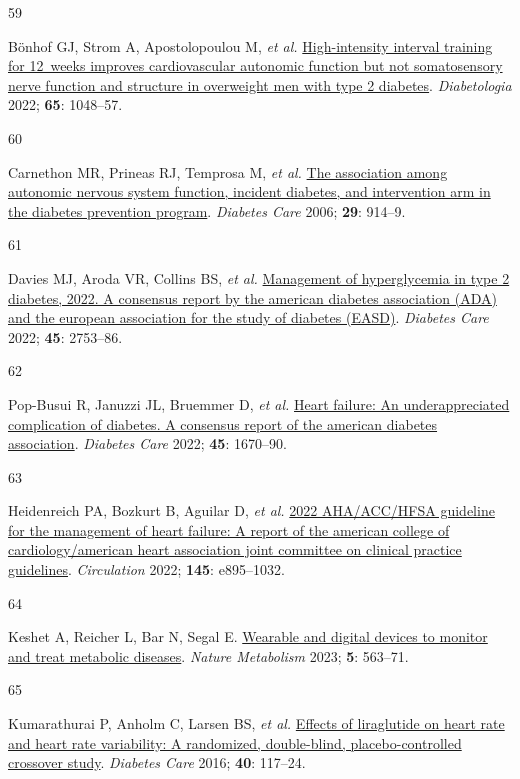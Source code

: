\documentclass[
  a4paper,
  headsepline=true,
  open=any]{scrbook}
\newlength{\cslhangindent}
\newlength{\csllabelwidth}
\newlength{\cslentryspacingunit} %
\newenvironment{CSLReferences}[2] %
 {%
  \setlength{\parindent}{0pt}
  \ifodd #1
  \let\oldpar\par
  \def\par{\hangindent=\cslhangindent\oldpar}
  \fi
  \setlength{\parskip}{#2\cslentryspacingunit}
 }%
 {}
\newcommand{\CSLLeftMargin}[1]{\parbox[t]{\csllabelwidth}{#1}}
\newcommand{\CSLRightInline}[1]{\parbox[t]{\linewidth - \csllabelwidth}{#1}\break}
\begin{document}
\begin{CSLReferences}{0}{0}
\leavevmode{}%
\CSLLeftMargin{59 }%
\CSLRightInline{Bönhof GJ, Strom A, Apostolopoulou M, \emph{et al.}
\href{https://doi.org/10.1007/s00125-022-05674-w}{High-intensity
interval training for 12~weeks improves cardiovascular autonomic
function but not somatosensory nerve function and structure in
overweight men with type 2 diabetes}. \emph{Diabetologia} 2022;
\textbf{65}: 1048--57.}

\leavevmode{}%
\CSLLeftMargin{60 }%
\CSLRightInline{Carnethon MR, Prineas RJ, Temprosa M, \emph{et al.}
\href{https://doi.org/10.2337/diacare.29.04.06.dc05-1729}{The
association among autonomic nervous system function, incident diabetes,
and intervention arm in the diabetes prevention program}. \emph{Diabetes
Care} 2006; \textbf{29}: 914--9.}

\leavevmode{}%
\CSLLeftMargin{61 }%
\CSLRightInline{Davies MJ, Aroda VR, Collins BS, \emph{et al.}
\href{https://doi.org/10.2337/dci22-0034}{Management of hyperglycemia in
type 2 diabetes, 2022. A consensus report by the american diabetes
association (ADA) and the european association for the study of diabetes
(EASD)}. \emph{Diabetes Care} 2022; \textbf{45}: 2753--86.}

\leavevmode{}%
\CSLLeftMargin{62 }%
\CSLRightInline{Pop-Busui R, Januzzi JL, Bruemmer D, \emph{et al.}
\href{https://doi.org/10.2337/dci22-0014}{Heart failure: An
underappreciated complication of diabetes. A consensus report of the
american diabetes association}. \emph{Diabetes Care} 2022; \textbf{45}:
1670--90.}

\leavevmode{}%
\CSLLeftMargin{63 }%
\CSLRightInline{Heidenreich PA, Bozkurt B, Aguilar D, \emph{et al.}
\href{https://doi.org/10.1161/CIR.0000000000001063}{2022 AHA/ACC/HFSA
guideline for the management of heart failure: A report of the american
college of cardiology/american heart association joint committee on
clinical practice guidelines}. \emph{Circulation} 2022; \textbf{145}:
e895--1032.}

\leavevmode{}%
\CSLLeftMargin{64 }%
\CSLRightInline{Keshet A, Reicher L, Bar N, Segal E.
\href{https://doi.org/10.1038/s42255-023-00778-y}{Wearable and digital
devices to monitor and treat metabolic diseases}. \emph{Nature
Metabolism} 2023; \textbf{5}: 563--71.}

\leavevmode{}%
\CSLLeftMargin{65 }%
\CSLRightInline{Kumarathurai P, Anholm C, Larsen BS, \emph{et al.}
\href{https://doi.org/10.2337/dc16-1580}{Effects of liraglutide on heart
rate and heart rate variability: A randomized, double-blind,
placebo-controlled crossover study}. \emph{Diabetes Care} 2016;
\textbf{40}: 117--24.}


\end{CSLReferences}
\end{document}
